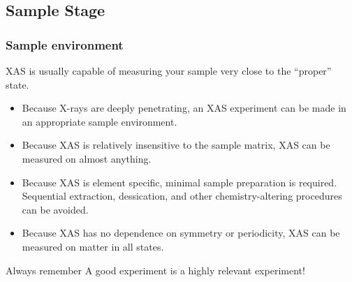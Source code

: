 \documentclass[10pt, xcolor=x11names, compress]{beamer}
\begin{document}
\subsection{Sample Stage}

\begin{frame}
  \frametitle{Sample environment}

  XAS is usually capable of measuring your sample very close to the
  ``proper'' state.
  \begin{itemize}
  \item Because X-rays are deeply penetrating, an XAS experiment can
    be made in an appropriate sample environment.
  \item Because XAS is relatively insensitive to the sample matrix, XAS
    can be measured on almost anything.
  \item Because XAS is element specific, minimal sample preparation is
    required.  Sequential extraction, dessication, and other
    chemistry-altering procedures can be avoided.
  \item Because XAS has no dependence on symmetry or periodicity, XAS
    can be measured on matter in all states.
  \end{itemize}

  \begin{exampleblock}{Always remember}
    A good experiment is a highly relevant experiment!
  \end{exampleblock}
\end{frame}
\end{document}

